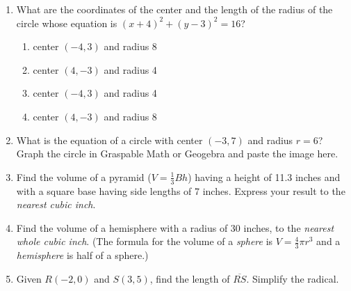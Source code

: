 \documentclass[12pt, twoside]{article}
\begin{document}
\begin{enumerate}
\newpage
\item What are the coordinates of the center and the length of the radius of the circle whose equation is $(x+4)^2+(y-3)^2=16$?
    \begin{enumerate}
      \item center $(-4,3)$ and radius 8
      \item center $(4,-3)$ and radius 4
      \item center $(-4,3)$ and radius 4
      \item center $(4,-3)$ and radius 8
    \end{enumerate}

\newpage
\item What is the equation of a circle with center $(-3,7)$ and radius $r=6$?\\[0.5cm]
  Graph the circle in Graspable Math or Geogebra and paste the image here.
    
\newpage
\item Find the volume of a pyramid ($V=\frac{1}{3}Bh$) having a height of 11.3 inches and with a square base having side lengths of 7 inches. Express your result to the \emph{nearest cubic inch}. \vspace{5cm}

\newpage
\item Find the volume of a hemisphere with a radius of 30 inches, to the \emph{nearest whole cubic inch}. (The formula for the volume of a \emph{sphere} is $V=\frac{4}{3}\pi r^3$ and a \emph{hemisphere} is half of a sphere.) \vspace{5cm}

\newpage
\item Given $R(-2,0)$ and $S(3,5)$, find the length of $\overline{RS}$. Simplify the radical. \vspace{4cm}



\end{enumerate}
\end{document}
